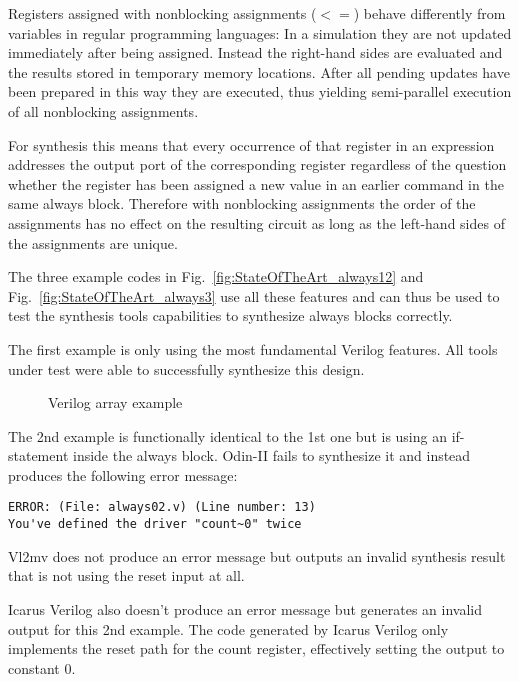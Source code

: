 Registers assigned with nonblocking assignments ($<=$) behave differently from
variables in regular programming languages: In a simulation they are not
updated immediately after being assigned.  Instead the right-hand sides are
evaluated and the results stored in temporary memory locations. After all
pending updates have been prepared in this way they are executed, thus yielding
semi-parallel execution of all nonblocking assignments.

For synthesis this means that every occurrence of that register in an expression
addresses the output port of the corresponding register regardless of the question whether the register
has been assigned a new value in an earlier command in the same always block.
Therefore with nonblocking assignments the order of the assignments has no effect
on the resulting circuit as long as the left-hand sides of the assignments are
unique.

The three example codes in Fig.~\ref{fig:StateOfTheArt_always12} and
Fig.~\ref{fig:StateOfTheArt_always3} use all these features and can thus be used
to test the synthesis tools capabilities to synthesize always blocks correctly.

The first example is only using the most fundamental Verilog features. All
tools under test were able to successfully synthesize this design.

\begin{figure}[b!]
	
	\caption{Verilog array example}
	\label{fig:StateOfTheArt_arrays}
\end{figure}

The 2nd example is functionally identical to the 1st one but is using an
if-statement inside the always block. Odin-II fails to synthesize it and
instead produces the following error message:

\begin{verbatim}
ERROR: (File: always02.v) (Line number: 13)
You've defined the driver "count~0" twice
\end{verbatim}

Vl2mv does not produce an error message but outputs an invalid synthesis result
that is not using the reset input at all.

Icarus Verilog also doesn't produce an error message but generates an invalid output
for this 2nd example. The code generated by Icarus Verilog only implements the reset
path for the count register, effectively setting the output to constant 0.

